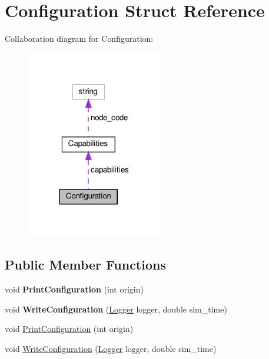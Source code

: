 \hypertarget{structConfiguration}{}\section{Configuration Struct Reference}
\label{structConfiguration}


Collaboration diagram for Configuration\+:\nopagebreak
\begin{figure}[H]
\begin{center}
\leavevmode
\includegraphics[width=169pt]{structConfiguration__coll__graph}
\end{center}
\end{figure}
\subsection*{Public Member Functions}
\begin{DoxyCompactItemize}
\item 
\mbox{\label{structConfiguration_ab77ba6f9704fe0ac90f92f8944268845}} 
void {\bfseries Print\+Configuration} (int origin)
\item 
\mbox{\label{structConfiguration_acdb9f693e0b773ee8ffb7cf18dad69d7}} 
void {\bfseries Write\+Configuration} (\hyperlink{structLogger}{Logger} logger, double sim\+\_\+time)
\item 
void \hyperlink{structConfiguration_ab77ba6f9704fe0ac90f92f8944268845}{Print\+Configuration} (int origin)
\item 
void \hyperlink{structConfiguration_acdb9f693e0b773ee8ffb7cf18dad69d7}{Write\+Configuration} (\hyperlink{structLogger}{Logger} logger, double sim\+\_\+time)
\end{DoxyCompactItemize}
